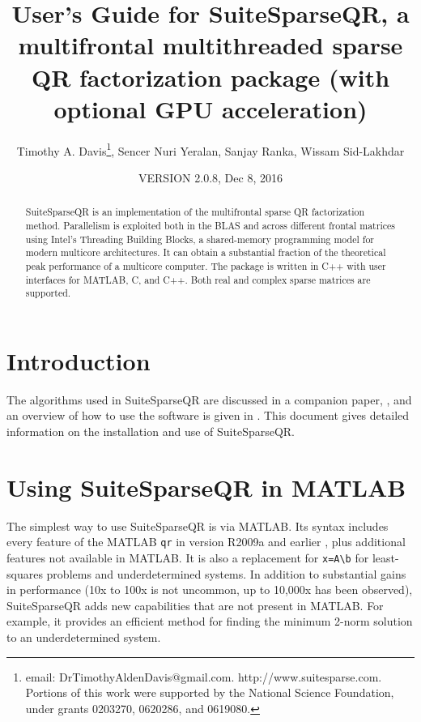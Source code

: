 \documentclass[12pt]{article}
\title{User's Guide for SuiteSparseQR, a multifrontal multithreaded sparse
QR factorization package (with optional GPU acceleration)}
\author{Timothy A. Davis\thanks{
email: DrTimothyAldenDavis@gmail.com.
http://www.suitesparse.com.
Portions of this work were supported by the National
Science Foundation, under grants 0203270, 0620286, and 0619080.},
Sencer Nuri Yeralan, Sanjay Ranka, Wissam Sid-Lakhdar}
\date{VERSION 2.0.8, Dec 8, 2016}
\begin{document}
\maketitle

\begin{abstract}

SuiteSparseQR is an implementation of the multifrontal sparse QR factorization
method.  Parallelism is exploited both in the BLAS and across different frontal
matrices using Intel's Threading Building Blocks, a shared-memory programming
model for modern multicore architectures.  It can obtain a substantial fraction
of the theoretical peak performance of a multicore computer.  The package is
written in C++ with user interfaces for MATLAB, C, and C++.  Both real and
complex sparse matrices are supported.

\end{abstract}

\maketitle

\section{Introduction}
\label{intro}

The algorithms used in SuiteSparseQR are discussed in a companion paper,
\cite{Davis08a}, and an overview of how to use the software is given in
\cite{Davis08b}.  This document gives detailed information on the installation
and use of SuiteSparseQR.

\section{Using SuiteSparseQR in MATLAB}

The simplest way to use SuiteSparseQR is via MATLAB.  Its syntax includes every
feature of the MATLAB \verb'qr' in version R2009a and earlier
\cite{GilbertMolerSchreiber}, plus additional features not available in MATLAB.
It is also a replacement for \verb'x=A\b' for least-squares problems and
underdetermined systems.  In addition to substantial gains in performance (10x
to 100x is not uncommon, up to 10,000x has been observed), SuiteSparseQR adds
new capabilities that are not present in MATLAB.  For example, it provides an
efficient method for finding the minimum 2-norm solution to an underdetermined
system.
\end{document}
